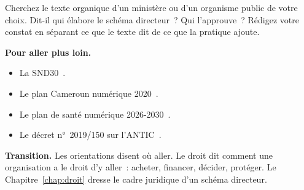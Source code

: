 \begin{boxexo}[title={\ding{45}\quad Exercice~6.4. Texte organique \niveauexpert}]
Cherchez le texte organique d'un ministère ou d'un organisme public de votre choix. Dit-il qui élabore le schéma directeur~? Qui l'approuve~? Rédigez votre constat en séparant ce que le texte dit de ce que la pratique ajoute.
\end{boxexo}

\bigskip

\begin{boxinfo}
\textbf{Pour aller plus loin.}
\begin{itemize}
    \item La SND30~\cite{snd30}.
    \item Le plan Cameroun numérique 2020~\cite{camnum2020}.
    \item Le plan de santé numérique 2026-2030~\cite{psnsn2026}.
    \item Le décret n°~2019/150 sur l'ANTIC~\cite{decret2019150}.
\end{itemize}
\end{boxinfo}

\begin{boxinfo}
\textbf{Transition.} Les orientations disent où aller. Le droit dit comment une organisation a le droit d'y aller~: acheter, financer, décider, protéger. Le Chapitre~\ref{chap:droit} dresse le cadre juridique d'un schéma directeur.
\end{boxinfo}
